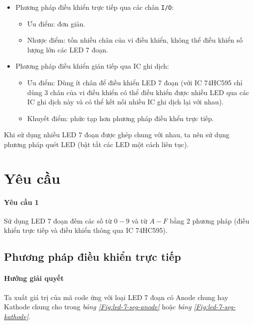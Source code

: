 \begin{itemize}
\item Phương pháp điều khiển trực tiếp qua các chân \verb|I/O|:
\begin{itemize}
\item Ưu điểm: đơn giản.
\item Nhược điểm: tốn nhiều chân của vi điều khiển, không thể điều khiển số lượng lớn các LED 7 đoạn.
\end{itemize}
\item Phương pháp điều khiển gián tiếp qua IC ghi dịch:
\begin{itemize}
\item Ưu điểm: Dùng ít chân để điều khiển LED 7 đoạn (với IC 74HC595 chỉ dùng 3 chân của vi điều khiển có thể điều khiển được nhiều LED qua các IC ghi dịch này và có thể kết nối nhiều IC ghi dịch lại với nhau).
\item Khuyết điểm: phức tạp hơn phương pháp điều khển trực tiếp.
\end{itemize}
\end{itemize}
Khi sử dụng nhiều LED 7 đoạn được ghép chung với nhau, ta nên sử dụng phương pháp quét LED (bật tắt các LED một cách liên tục).
\tocless \section{Yêu cầu}
\paragraph{Yêu cầu 1}Sử dụng LED 7 đoạn đếm các số từ $0 - 9$ và từ $A-F$ bằng 2 phương pháp (điều khiển trực tiếp và điều khiển thông qua IC 74HC595).
\tocless \subsection{Phương pháp điều khiển trực tiếp}
\paragraph{Hướng giải quyết} Ta xuất giá trị của mã code ứng với loại LED 7 đoạn có Anode chung hay Kathode chung cho trong \textit{bảng \ref{Fig:led-7-seg-anode}} hoặc \textit{bảng \ref{Fig:led-7-seg-kathode}}.
